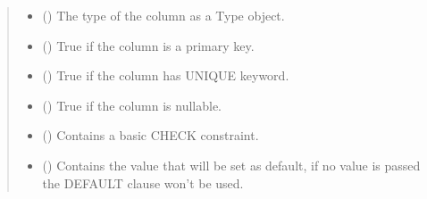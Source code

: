 \documentclass[letterpaper,10pt,english]{sphinxmanual}
\begin{document}
\begin{fulllineitems}
\begin{quote}
\begin{description}
\begin{itemize}
\item {} 
\sphinxAtStartPar
{} ({\hyperref[\detokenize{model:mini_sql.model.type.Type}]{}}) \textendash{} The type of the column as a Type object.

\item {} 
\sphinxAtStartPar
{} (\sphinxstyleliteralemphasis{\sphinxupquote{, }}) \textendash{} True if the column is a primary key.

\item {} 
\sphinxAtStartPar
{} (\sphinxstyleliteralemphasis{\sphinxupquote{, }}) \textendash{} True if the column has UNIQUE keyword.

\item {} 
\sphinxAtStartPar
{} (\sphinxstyleliteralemphasis{\sphinxupquote{, }}) \textendash{} True if the column is nullable.

\item {} 
\sphinxAtStartPar
{} (\sphinxstyleliteralemphasis{\sphinxupquote{, }}) \textendash{} Contains a basic CHECK constraint.

\item {} 
\sphinxAtStartPar
{} (\sphinxstyleliteralemphasis{\sphinxupquote{, }}) \textendash{} Contains the value that will be set as default, if no value
is passed the DEFAULT clause won’t be used.

\end{itemize}

\end{description}\end{quote}


\end{fulllineitems}
\end{document}
